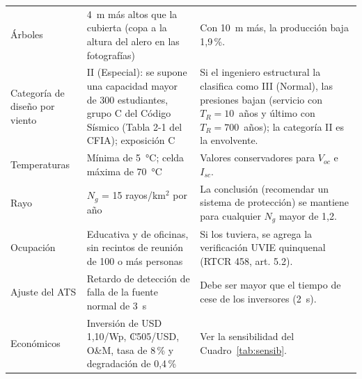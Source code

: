 \documentclass[12pt]{article}
\begin{document}
{\begin{longtable}{L{3.3cm}L{5.0cm}L{6.6cm}}
Árboles & 4~m más altos que la cubierta (copa a la altura del alero en las fotografías) & Con 10~m más, la producción baja 1,9\,\%.\\
Categoría de diseño por viento & II (Especial): se supone una capacidad mayor de 300 estudiantes, grupo C del Código Sísmico (Tabla 2-1 del CFIA); exposición C & Si el ingeniero estructural la clasifica como III (Normal), las presiones bajan (servicio con $T_R=10$~años y último con $T_R=700$~años); la categoría II es la envolvente.\\
Temperaturas & Mínima de 5~°C; celda máxima de 70~°C & Valores conservadores para $V_{oc}$ e $I_{sc}$.\\
Rayo & $N_g$ = 15 rayos/km$^2$ por año & La conclusión (recomendar un sistema de protección) se mantiene para cualquier $N_g$ mayor de 1,2.\\
Ocupación & Educativa y de oficinas, sin recintos de reunión de 100 o más personas & Si los tuviera, se agrega la verificación UVIE quinquenal (RTCR 458, art. 5.2).\\
Ajuste del ATS & Retardo de detección de falla de la fuente normal de 3~s & Debe ser mayor que el tiempo de cese de los inversores (2~s).\\
Económicos & Inversión de USD 1,10/Wp, ₡505/USD, O\&M, tasa de 8\,\% y degradación de 0,4\,\% & Ver la sensibilidad del Cuadro~\ref{tab:sensib}.\\
\bottomrule
\end{longtable}}

\end{document}
